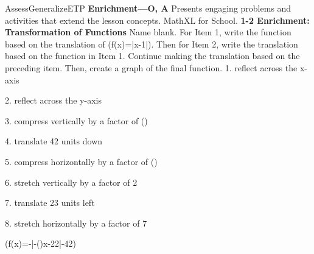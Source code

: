\documentclass{article}
\newenvironment{te-addendum}[2]{}{}     %
\newcommand{\answer}[1]{}               %
\newcommand{\placeholder}[2]{}          %
\newcommand{\te}[1]{}                   %
\begin{document}
\begin{te-addendum}{Assess}{GeneralizeETP}
\textbf{Enrichment—O, A}
Presents engaging problems and activities that extend the lesson concepts.
MathXL for School.
\textbf{1-2 Enrichment: Transformation of Functions}
Name blank.
For Item 1, write the function based on the translation of (f(x)=|x-1|). Then for Item 2, write the translation based on the function in Item 1. Continue making the translation based on the preceding item. Then, create a graph of the final function.
1. reflect across the x-axis
\answer{(f(x)=-|x-1|)}
2. reflect across the y-axis
\answer{(f(x)=-|-x-1|)}
3. compress vertically by a factor of ()
\answer{(f(x)=-\frac{1}{5}|-x-1|)}
4. translate 42 units down
\answer{(f(x)=-\frac{1}{5}|-x-1|-42)}
5. compress horizontally by a factor of ()
\answer{(f(x)=-\frac{1}{5}|-(12)x-1|-42)}
6. stretch vertically by a factor of 2
\answer{(f(x)=-\frac{2}{5}|-(12)x-1|-42)}
7. translate 23 units left
\answer{(f(x)=-\frac{2}{5}|-(12)x-22|-42)}
8. stretch horizontally by a factor of 7
\answer{(f(x)=-\frac{2}{5}|-(\frac{12}{7})x-22|-42)}
(f(x)=-|-()x-22|-42)
\placeholder{graph}{Enrichment final graph: magenta inverted V, vertex approximately (-12.8,-42), crosses y-axis approximately -51, tails to approximately (-70,-81) and (50,-85), with arrowheads. Grid spacing 10 on both axes, x labels -60,-40,-20,20,40, y labels 10,-20,-60,-80; arrowed x/y axes, origin O, visible window approximately x=-70 to 50,y=-90 to 20. No marked points.}
\te{Printed step 6 leaves the -42 unchanged under a vertical stretch; likely -84. Printed step 7 changes -1 to -22 for a 23-unit left translation; likely the input substitution should be applied to the entire preceding input expression. Printed equations and final graph are retained. The preview title prints singular “Transformation.”}
\end{te-addendum}
\end{document}
